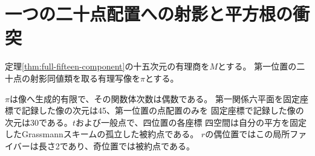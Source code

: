 \section{一つの二十点配置への射影と平方根の衝突}
\label{sec:single-configuration-projection}
定理\ref{thm:full-fifteen-component}の十五次元の有理商を$M$とする。
第一位置の二十点の射影同値類を取る有理写像を$\pi$とする。

\begin{theorem}\label{thm:single-configuration-projection}
$\pi$は像へ生成的有限で、その関数体次数は偶数である。
第一関係六平面を固定座標で記録した像の次元は45、第一位置の点配置のみを
固定座標で記録した像の次元は30である。$t$および一般点で、四位置の各座標
四空間は自分の平方を固定したGrassmannスキームの孤立した被約点である。
$r$の偶位置ではこの局所ファイバーは長さ2であり、奇位置では被約点である。
\end{theorem}
